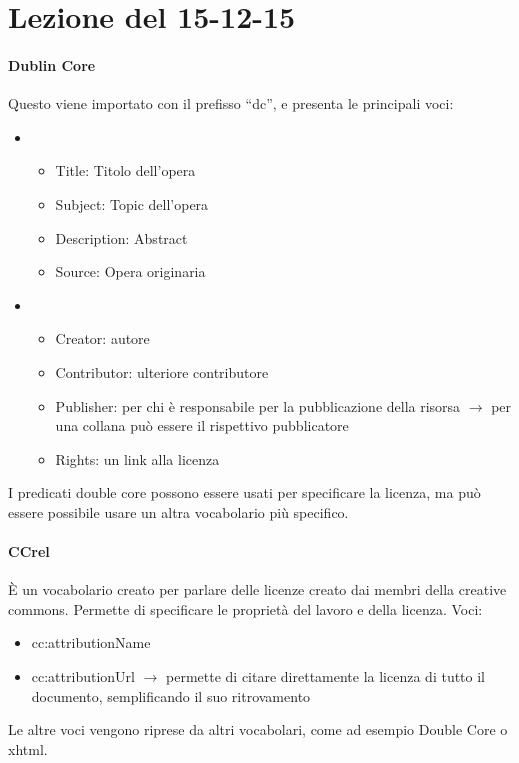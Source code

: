 \section{Lezione del 15-12-15}
\graphicspath{ {res/data/15-12-15/} }


\paragraph*{Dublin Core}Questo viene importato con il prefisso ``dc'', e presenta le principali voci:
\begin{itemize}
\item[Contenuto]
  \begin{itemize}
    
  \item Title: Titolo dell'opera
  \item Subject: Topic dell'opera
  \item Description: Abstract
  \item Source: Opera originaria
    
  \end{itemize}

\item[Propriet\`a Intellettuale]
  \begin{itemize}

  \item Creator: autore
  \item Contributor: ulteriore contributore
  \item Publisher: per chi \`e responsabile per la pubblicazione della risorsa $\to$ per una collana pu\`o essere il rispettivo pubblicatore
    \item Rights: un link alla licenza
    
  \end{itemize}
  
\end{itemize}

I predicati double core possono essere usati per specificare la licenza, ma pu\`o essere possibile usare un altra vocabolario pi\`u specifico.

\paragraph*{CCrel} \`E un vocabolario creato per parlare delle licenze creato dai membri della creative commons. Permette di specificare le propriet\`a del lavoro e della licenza.
Voci:
\begin{itemize}

\item cc:attributionName
\item cc:attributionUrl $\to$ permette di citare direttamente la licenza di tutto il documento, semplificando il suo ritrovamento
  
\end{itemize}

Le altre voci vengono riprese da altri vocabolari, come ad esempio Double Core o xhtml.
